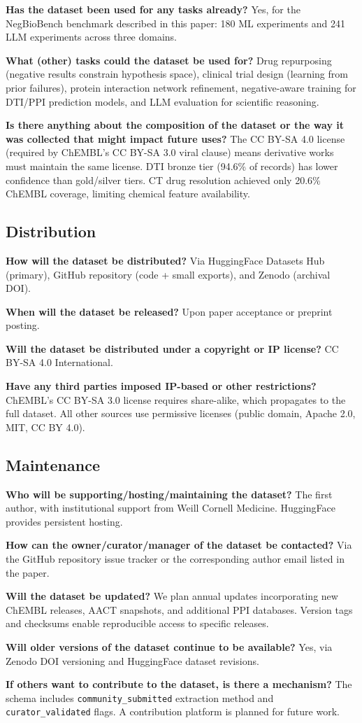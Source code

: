 \textbf{Has the dataset been used for any tasks already?}
Yes, for the NegBioBench benchmark described in this paper: 180 ML experiments and 241 LLM experiments across three domains.

\textbf{What (other) tasks could the dataset be used for?}
Drug repurposing (negative results constrain hypothesis space), clinical trial design (learning from prior failures), protein interaction network refinement, negative-aware training for DTI/PPI prediction models, and LLM evaluation for scientific reasoning.

\textbf{Is there anything about the composition of the dataset or the way it was collected that might impact future uses?}
The CC BY-SA 4.0 license (required by ChEMBL's CC BY-SA 3.0 viral clause) means derivative works must maintain the same license. DTI bronze tier (94.6\% of records) has lower confidence than gold/silver tiers. CT drug resolution achieved only 20.6\% ChEMBL coverage, limiting chemical feature availability.

\subsection{Distribution}

\textbf{How will the dataset be distributed?}
Via HuggingFace Datasets Hub (primary), GitHub repository (code + small exports), and Zenodo (archival DOI).

\textbf{When will the dataset be released?}
Upon paper acceptance or preprint posting.

\textbf{Will the dataset be distributed under a copyright or IP license?}
CC BY-SA 4.0 International.

\textbf{Have any third parties imposed IP-based or other restrictions?}
ChEMBL's CC BY-SA 3.0 license requires share-alike, which propagates to the full dataset. All other sources use permissive licenses (public domain, Apache 2.0, MIT, CC BY 4.0).

\subsection{Maintenance}

\textbf{Who will be supporting/hosting/maintaining the dataset?}
The first author, with institutional support from Weill Cornell Medicine. HuggingFace provides persistent hosting.

\textbf{How can the owner/curator/manager of the dataset be contacted?}
Via the GitHub repository issue tracker or the corresponding author email listed in the paper.

\textbf{Will the dataset be updated?}
We plan annual updates incorporating new ChEMBL releases, AACT snapshots, and additional PPI databases. Version tags and checksums enable reproducible access to specific releases.

\textbf{Will older versions of the dataset continue to be available?}
Yes, via Zenodo DOI versioning and HuggingFace dataset revisions.

\textbf{If others want to contribute to the dataset, is there a mechanism?}
The schema includes \texttt{community\_submitted} extraction method and \texttt{curator\_validated} flags. A contribution platform is planned for future work.
